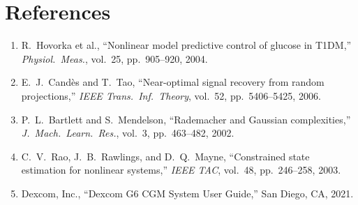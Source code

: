 \documentclass[11pt,a4paper]{article}
\begin{document}
\section*{References}
\begin{enumerate}
  \item R.\ Hovorka et al., ``Nonlinear model predictive control of glucose in T1DM,'' \textit{Physiol.\ Meas.}, vol.\ 25, pp.\ 905--920, 2004.
  \item E.\ J.\ Candès and T.\ Tao, ``Near-optimal signal recovery from random projections,'' \textit{IEEE Trans.\ Inf.\ Theory}, vol.\ 52, pp.\ 5406--5425, 2006.
  \item P.\ L.\ Bartlett and S.\ Mendelson, ``Rademacher and Gaussian complexities,'' \textit{J.\ Mach.\ Learn.\ Res.}, vol.\ 3, pp.\ 463--482, 2002.
  \item C.\ V.\ Rao, J.\ B.\ Rawlings, and D.\ Q.\ Mayne, ``Constrained state estimation for nonlinear systems,'' \textit{IEEE TAC}, vol.\ 48, pp.\ 246--258, 2003.
  \item Dexcom, Inc., ``Dexcom G6 CGM System User Guide,'' San Diego, CA, 2021.
\end{enumerate}
\end{document}
